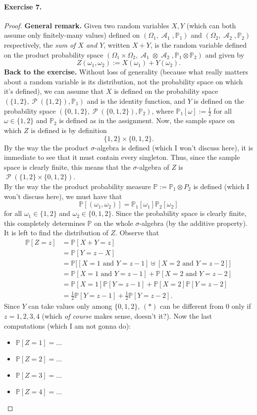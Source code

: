\documentclass[12pt,a4paper]{report}
\theoremstyle{definition}
\theoremstyle{num.custom-title}
\DeclareMathOperator{\A}{\mathcal{A}}
\DeclareMathOperator{\PP}{\mathcal{P}}
\renewcommand{\1}{\mathbbm{1}}
\renewcommand{\P}{\mathbb{P}}
\begin{document}
\paragraph{Exercise 7.}
\begin{proof}
\textbf{General remark.} Given two random variables $X,Y$ (which can both assume only finitely-many values) defined on $(\Omega_1,\A_1,\P_1)$ and $(\Omega_2,\A_2,\P_2)$ respectively, the \emph{sum of $X$ and $Y$}, written $X+Y$, is the random variable defined on the product probability space $(\Omega_1 \times \Omega_2, \A_1 \otimes \A_2, \P_1 \otimes \P_2)$ and given by
\[
Z(\omega_1,\omega_2) := X(\omega_1) + Y(\omega_2).
\]
\textbf{Back to the exercise.} Without loss of generality (because what really matters about a random variable is its distribution, not the probability space on which it's defined), we can assume that $X$ is defined on the probability space $(\{1,2\},\PP(\{1,2\}),\P_1)$ and is the identity function, and $Y$ is defined on the probability space $(\{0,1,2\},\PP(\{0,1,2\}),\P_2)$, where $\P_1[\omega] := \frac{1}{2}$ for all $\omega \in \{1,2\}$ and $\P_2$ is defined as in the assignment. Now, the sample space on which $Z$ is defined is by definition
\[
\{1,2\} \times \{0,1,2\}.
\]
By the way the the product $\sigma$-algebra is defined (which I won't discuss here), it is immediate to see that it must contain every singleton. Thus, since the sample space is clearly finite, this means that the $\sigma$-algebra of $Z$ is $\PP(\{1,2\} \times \{0,1,2\})$.\\
By the way the the product probability measure $\P := \P_1 \otimes P_2$ is defined (which I won't discuss here), we must have that
\[
\P[(\omega_1,\omega_2)] = \P_1[\omega_1] \P_2[\omega_2]
\]
for all $\omega_1 \in \{1,2\}$ and $\omega_2 \in \{0,1,2\}$. Since the probability space is clearly finite, this completely determines $\P$ on the whole $\sigma$-algebra (by the additive property).\\
It is left to find the distribution of $Z$. Observe that
\begin{align*}
\P[Z=z] 
&= \P[X+Y=z] \\
&= \P[Y = z -X] \\
&= \P \Big[ [X=1 \text{ and } Y = z-1] \uplus [X=2 \text{ and } Y = z-2] \Big] \\
&= \P[X=1 \text{ and } Y = z-1] + \P[X=2 \text{ and } Y = z-2] \\
&= \P[X=1] \P[Y=z-1] + \P[X=2]\P[Y=z-2] \tag{by independence} \\
&= \frac{1}{2} \P[Y=z-1] + \frac{1}{2} \P[Y = z-2]. \tag{$*$}
\end{align*}
Since $Y$ can take values only among $\{0,1,2\}$, $(*)$ can be different from $0$ only if $z=1,2,3,4$ (which \emph{of course} makes sense, doesn't it?). Now the last computations (which I am not gonna do):
\begin{itemize}
\item $\P[Z=1] = ...$
\item $\P[Z=2] = ...$
\item $\P[Z=3] = ...$
\item $\P[Z=4] = ...$
\end{itemize}
\end{proof}
\end{document}
